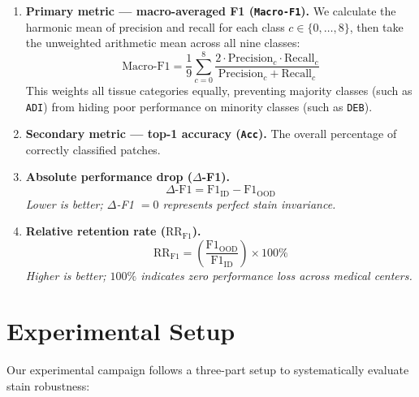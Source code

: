\documentclass[11pt,a4paper]{article}
\begin{document}
\begin{enumerate}
  \item \textbf{Primary metric --- macro-averaged F1 (\texttt{Macro-F1}).} We
        calculate the harmonic mean of precision and recall for each class
        $c \in \{0,\dots,8\}$, then take the unweighted arithmetic mean across all
        nine classes:
        \begin{equation}
          \text{Macro-F1} = \frac{1}{9}\sum_{c=0}^{8}
            \frac{2 \cdot \text{Precision}_c \cdot \text{Recall}_c}
                 {\text{Precision}_c + \text{Recall}_c}
        \end{equation}
        This weights all tissue categories equally, preventing majority classes (such
        as \texttt{ADI}) from hiding poor performance on minority classes (such as
        \texttt{DEB}).
  \item \textbf{Secondary metric --- top-1 accuracy (\texttt{Acc}).} The overall
        percentage of correctly classified patches.
  \item \textbf{Absolute performance drop ($\Delta$-F1).}
        \begin{equation}
          \Delta\text{-F1} = \text{F1}_{\text{ID}} - \text{F1}_{\text{OOD}}
        \end{equation}
        \textit{Lower is better; $\Delta$-F1 $=0$ represents perfect stain
        invariance.}
  \item \textbf{Relative retention rate ($\text{RR}_{\text{F1}}$).}
        \begin{equation}
          \text{RR}_{\text{F1}} = \left(
            \frac{\text{F1}_{\text{OOD}}}{\text{F1}_{\text{ID}}}
          \right) \times 100\%
        \end{equation}
        \textit{Higher is better; $100\%$ indicates zero performance loss across
        medical centers.}
\end{enumerate}

\section{Experimental Setup}
Our experimental campaign follows a three-part setup to systematically evaluate stain robustness:
\end{document}

